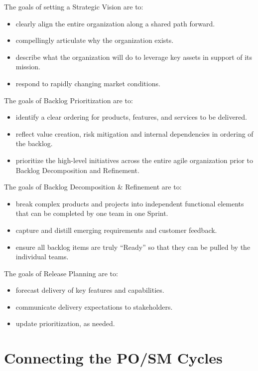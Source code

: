 \documentclass[12pt,a4paper,parskip=full]{scrartcl}
\begin{document}
The goals of setting a Strategic Vision are to:
\begin{itemize}
\item clearly align the entire organization along a shared path forward.
\item compellingly articulate why the organization exists.
\item describe what the organization will do to leverage key assets in
support of its mission.
\item respond to rapidly changing market conditions.
\end{itemize}
The goals of Backlog Prioritization are to:
\begin{itemize}
\item identify a clear ordering for products, features, and services to be
delivered.
\item reflect value creation, risk mitigation and internal dependencies in
ordering of the backlog.
\item prioritize the high-level initiatives across the entire agile
organization prior to Backlog Decomposition and Refinement.
\end{itemize}
The goals of Backlog Decomposition \& Refinement are to:
\begin{itemize}
\item break complex products and projects into independent functional
elements that can be completed by one team in one Sprint.
\item capture and distill emerging requirements and customer feedback.
\item ensure all backlog items are truly ``Ready'' so that they can be
pulled by the individual teams.
\end{itemize}
The goals of Release Planning are to:
\begin{itemize}
\item forecast delivery of key features and capabilities.
\item communicate delivery expectations to stakeholders.
\item update prioritization, as needed.
\end{itemize}

\section{Connecting the PO/SM Cycles}
\end{document}
